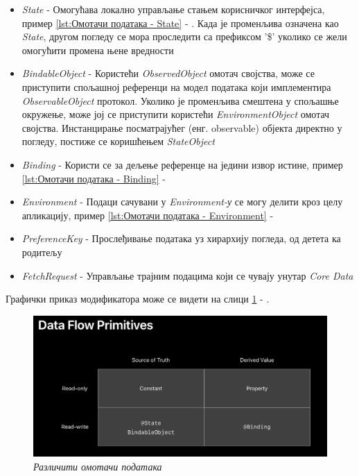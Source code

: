 \documentclass[12pt,oneside]{memoir}
\begin{document}
\begin{itemize}
    \item \textit{State} - Омогућава локално управљање стањем корисничког интерфејса, пример \ref{lst:Омотачи података - State} - . Када је променљива означена као \textit{State}, другом погледу се мора проследити са префиксом '\$' уколико се жели омогућити промена њене вредности
    \item \textit{BindableObject} - Користећи \textit{ObservedObject} омотач својства, може се приступити спољашној референци на модел података који имплементира \textit{ObservableObject} протокол. Уколико је променљива смештена у спољашње окружење, може јој се приступити користећи \textit{EnvironmentObject} омотач својства. Инстанцирање посматрајућег (енг. observable) објекта директно у погледу, постиже се коришћењем \textit{StateObject}
    \item \textit{Binding} - Користи се за дељење референце на једини извор истине, пример \ref{lst:Омотачи података - Binding} - 
    \item \textit{Environment} - Подаци сачувани у \textit{Environment-у} се могу делити кроз целу апликацију, пример \ref{lst:Омотачи података - Environment} - 
    \item \textit{PreferenceKey} - Прослеђивање података уз хирархију погледа, од детета ка родитељу
    \item \textit{FetchRequest} - Управљање трајним подацима који се чувају унутар \textit{Core Data}
\end{itemize}

Графички приказ модификатора може се видети на слици \ref{slika:data_flow_primitives} - .

\begin{figure}[H]
\includegraphics[width=1\textwidth]{images/DataFlowPrimitives.png}
\centering
\caption{\textit{Различити омотачи података}}
\label{slika:data_flow_primitives}
\end{figure}
\end{document}
